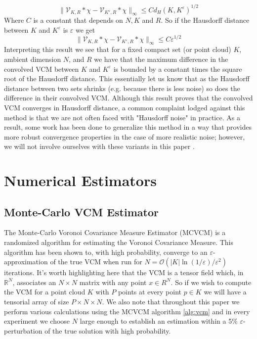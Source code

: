 \documentclass{article}
\begin{document}
\begin{equation}
    \| \mathcal{V}_{K,R} * \chi - \mathcal{V}_{K^{\varepsilon},R}*\chi \|_{\infty} \leq C d_H(K,K^\varepsilon)^{1/2}
\end{equation}
Where $C$ is a constant that depends on $N,K$ and $R$. So if the Hausdorff distance between $K$ and $K^\varepsilon$ is $\varepsilon$ we get
\begin{equation}
\| \mathcal{V}_{K,R} * \chi - \mathcal{V}_{K^{\varepsilon},R}*\chi \|_{\infty} \leq C \varepsilon^{1/2}
\end{equation}
Interpreting this result we see that for a fixed compact set (or point cloud) $K$, ambient dimension $N$, and $R$ we have that the maximum difference in the convolved VCM between $K$ and $K^\varepsilon$ is bounded by a constant times the square root of the Hausdorff distance. This essentially let us know that as the Hausdorff distance between two sets shrinks (e.g. because there is less noise) so does the difference in their convolved VCM.   
Although this result proves that the convolved VCM converges in Hausdorff distance, a common complaint lodged against this method is that we are not often faced with "Hausdorff noise" in practice. As a result, some work has been done to generalize this method in a way that provides more robust convergence properties in the case of more realistic noise; however, we will not involve ourselves with these variants in this paper \cite{Cuel_2015,geo_inference_for_measures}.

\section{Numerical Estimators} 

\subsection{Monte-Carlo VCM Estimator}
The Monte-Carlo Voronoi Covariance Measure Estimator (MCVCM) is a randomized algorithm for estimating the Voronoi Covariance Measure. This algorithm has been shown to, with high probability, converge to an $\varepsilon$-approximation of the true VCM when run for $N = \mathcal{O}(|K| \ln(1/\varepsilon) / \varepsilon^2)$ iterations. It's worth highlighting here that the VCM is a tensor field which, in $\mathbb{R}^N$, associates an $N \times N$ matrix with any point $x \in R^N$. So if we wish to compute the VCM for a point cloud $K$ with $P$ points at every point $p \in K$ we will have a tensorial array of size $P\times N\times N$. We also note that throughout this paper we perform various calculations using the MCVCM algorithm \eqref{alg:vcm} and in every experiment we choose $N$ large enough to establish an estimation within a 5\% $\varepsilon$-perturbation of the true solution with high probability.     
\end{document}
